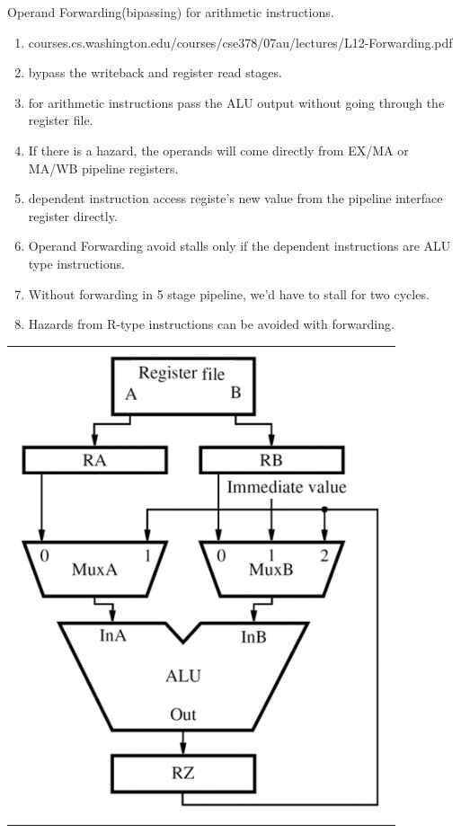 \begin{enumerate}
\begin{minipage}{\linewidth}
    \item Operand Forwarding(bipassing) for arithmetic instructions.
    \begin{enumerate}
        \item courses.cs.washington.edu/courses/cse378/07au/lectures/L12-Forwarding.pdf
        \item bypass the writeback and register read stages.
        \item for arithmetic instructions pass the ALU output without going through the register file.
        \item If there is a hazard, the operands will come directly from EX/MA or MA/WB pipeline registers.
        \item dependent instruction access registe's new value from the pipeline interface register directly.
        \item Operand Forwarding avoid stalls only if the dependent instructions are ALU type instructions.
        \item Without forwarding in 5 stage pipeline, we’d have to stall for two cycles.
        \item Hazards from R-type instructions can be avoided with forwarding.
    \end{enumerate}

    \begin{center}
    \begin{myTableStyle} \begin{tabular}{ c }
               \includegraphics[scale=0.7]{./images/oprand_forwarding.jpeg}  \\
    \end{tabular} \end{myTableStyle} \vspace{0.08in}
    \end{center}
    \end{minipage}


\end{enumerate}
